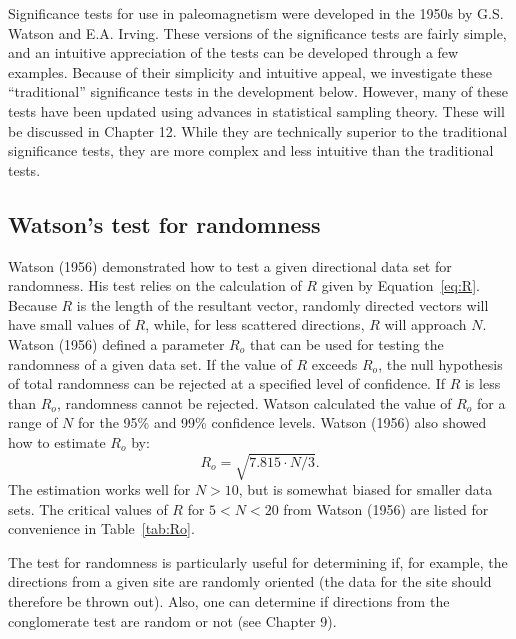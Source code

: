 Significance tests for use in paleomagnetism were developed in the 1950s by
G.S.  Watson and E.A. Irving. These versions of the significance tests are fairly simple, and an intuitive appreciation
of the tests can be developed through a few examples. Because of their simplicity and intuitive appeal,
we investigate these ``traditional'' significance tests in the development below. However, many of these tests
have been updated using advances in statistical
sampling theory. These will be discussed in Chapter 12.  While they are technically superior to the traditional significance tests,  they are more complex and less intuitive than
the traditional tests.


\subsection {Watson's test for randomness}
\label{sect:Ro}


%
Watson (1956) \nocite{watson56}
 demonstrated how to test a given directional
data set for randomness.  His test
relies on the calculation of $R$ given by Equation~\ref{eq:R}.  Because $R$ is the
length of the resultant vector, randomly directed vectors will have small values of $R$,
while, for less scattered directions, $R$ will approach $N$.  
Watson (1956) defined a parameter $R_o$ that can be used for testing 
the randomness of a given data set.  If the value of  $R$  
exceeds $R_o$, the null hypothesis of total randomness can be rejected at a
specified level of confidence.  If $R$
is less than $R_o$, randomness cannot be rejected. 
Watson calculated the value of $R_o$ for a range of $N$ for the 95\% and 99\%  confidence levels.  Watson  (1956) also showed how to estimate $R_o$ by:
\begin{equation}
R_o=\sqrt{ 7.815 \cdot N/3}.
\label{eq:Ro}
\end{equation}
\noindent The estimation works well for $N>10$, but
is somewhat biased for smaller data sets.  The critical
values of $R$ for $5<N< 20$ from
%
 Watson  (1956) are listed
for convenience in Table~\ref{tab:Ro}.  




The test for randomness is particularly useful for determining if, for
example, the directions from a given site are randomly oriented
(the data for the  site should therefore be thrown out).  Also, 
one can determine  if directions from
%
the conglomerate test are random or not (see Chapter 9).  


